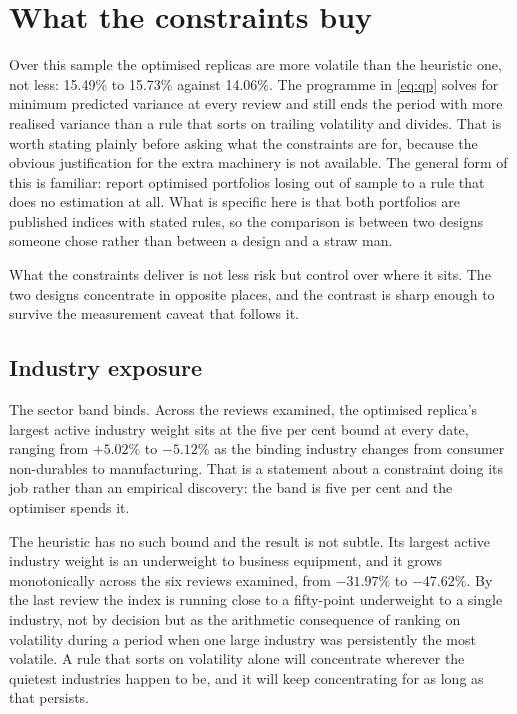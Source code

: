 \section{What the constraints buy}
\label{sec:constraints}
Over this sample the optimised replicas are more volatile than the heuristic
one, not less: 15.49\% to 15.73\% against 14.06\%. The programme in
\eqref{eq:qp} solves for minimum predicted variance at every review and still
ends the period with more realised variance than a rule that sorts on trailing
volatility and divides. That is worth stating plainly before asking what the
constraints are for, because the obvious justification for the extra machinery
is not available. The general form of this is familiar:
\citet{demiguel2009optimal} report optimised portfolios losing out of sample to
a rule that does no estimation at all. What is specific here is that both
portfolios are published indices with stated rules, so the comparison is
between two designs someone chose rather than between a design and a
straw man.

What the constraints deliver is not less risk but control over where it sits.
The two designs concentrate in opposite places, and the contrast is sharp
enough to survive the measurement caveat that follows it.

\subsection{Industry exposure}
The sector band binds. Across the reviews examined, the optimised replica's
largest active industry weight sits at the five per cent bound at every date,
ranging from $+5.02\%$ to $-5.12\%$ as the binding industry changes from
consumer non-durables to manufacturing. That is a statement about a constraint
doing its job rather than an empirical discovery: the band is five per cent and
the optimiser spends it.

The heuristic has no such bound and the result is not subtle. Its largest
active industry weight is an underweight to business equipment, and it grows
monotonically across the six reviews examined, from $-31.97\%$ to $-47.62\%$.
By the last review the index is running close to a fifty-point underweight to a
single industry, not by decision but as the arithmetic consequence of ranking
on volatility during a period when one large industry was persistently the
most volatile. A rule that sorts on volatility alone will concentrate wherever
the quietest industries happen to be, and it will keep concentrating for as
long as that persists.

